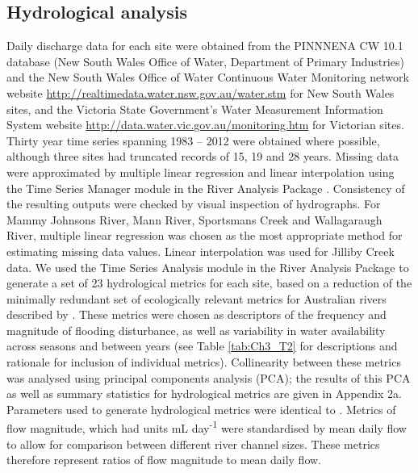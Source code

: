 \documentclass[openright,12pt,a4paper]{memoir}
\begin{document}
\subsection{Hydrological analysis}
Daily discharge data for each site were obtained from the PINNNENA CW 10.1 database (New South Wales Office of Water, Department of Primary Industries) and the New South Wales Office of Water Continuous Water Monitoring network website \url{http://realtimedata.water.nsw.gov.au/water.stm} for New South Wales sites, and the Victoria State Government’s Water Measurement Information System website \url{http://data.water.vic.gov.au/monitoring.htm} for Victorian sites.  Thirty year time series spanning 1983 – 2012 were obtained where possible, although three sites had truncated records of 15, 19 and 28 years. Missing data were approximated by multiple linear regression  and linear interpolation using the Time Series Manager module in the River Analysis Package \citep{marsh2003river}. Consistency of the resulting outputs were checked by visual
inspection of hydrographs. For Mammy Johnsons River, Mann River, Sportsmans Creek and Wallagaraugh River, multiple linear regression was chosen as the most
appropriate method for estimating missing data values. Linear interpolation was used for Jilliby Creek data.  We used the Time Series Analysis module in the River Analysis Package to generate a set of 23 hydrological metrics for each site, based on a reduction of the minimally redundant set of ecologically relevant metrics for Australian rivers described by \citet{Kennard2010}. These metrics were chosen as descriptors of the frequency and magnitude of flooding disturbance, as well as variability in water availability across seasons and between years (see Table \ref{tab:Ch3_T2} for descriptions and rationale for inclusion of individual metrics). Collinearity between these metrics was analysed using principal components analysis (PCA); the results of this PCA as well as summary statistics for hydrological metrics are given in Appendix 2a. Parameters used to generate hydrological metrics were identical to \citet{Lawson2015}. Metrics of flow magnitude, which had units mL day\textsuperscript{-1} were standardised by mean daily flow to allow for comparison between different river channel sizes. These metrics therefore represent ratios of flow magnitude to mean daily flow.
\end{document}
